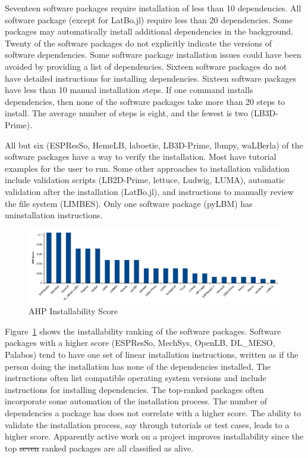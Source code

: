 \documentclass[final, 3p, times, authoryear]{elsarticle}
\providecommand{\DIFaddtex}[1]{{\protect\color{blue}\uwave{#1}}} %
\providecommand{\DIFdeltex}[1]{{\protect\color{red}\sout{#1}}}                      %
\providecommand{\DIFaddbegin}{} %
\providecommand{\DIFaddend}{} %
\providecommand{\DIFdelbegin}{} %
\providecommand{\DIFdelend}{} %
\providecommand{\DIFadd}[1]{\texorpdfstring{\DIFaddtex{#1}}{#1}} %
\providecommand{\DIFdel}[1]{\texorpdfstring{\DIFdeltex{#1}}{}} %
\begin{document}
Seventeen software packages require installation of less than 10 dependencies.
All software package (except for LatBo.jl) require less than 20 dependencies.
Some packages may automatically install additional dependencies in the
background. Twenty of the software packages do not explicitly indicate the
versions of software dependencies. Some software package installation issues
could have been avoided by providing a list of dependencies. Sixteen software
packages do not have detailed instructions for installing dependencies. Sixteen
software packages have less than 10 manual installation steps. If one command
installs dependencies, then none of the software packages take more than 20
steps to install. The average number of steps is eight, and the fewest is two
(LB3D-Prime).

All but six (ESPResSo, HemeLB, laboetie, LB3D-Prime, lbmpy, waLBerla) of the
software packages have a way to verify the installation. Most have tutorial
examples for the user to run. Some other approaches to installation validation
include validation scripts (LB2D-Prime, lettuce, Ludwig, LUMA), automatic
validation after the installation (LatBo.jl), and instructions to manually
review the file system (LIMBES). Only one software package (pyLBM) has
uninstallation instructions.

\begin{figure}[h!]
	\begin{center}
		\includegraphics[width=1.0\textwidth]{./figures/installability_chart.pdf}
		\caption{AHP Installability Score}
		\label{Fig_Installability}
	\end{center}
\end{figure}

Figure~\ref{Fig_Installability} shows the installability ranking of the software
packages. Software packages with a higher score (ESPResSo, MechSys, OpenLB,
DL\_MESO, Palabos\DIFaddbegin \DIFadd{, Sailfish}\DIFaddend ) tend to have one set of linear installation
instructions, written as if the person doing the installation has none of the
dependencies installed. The instructions often list compatible operating system
versions and include instructions for installing dependencies. The top-ranked
packages often incorporate some automation of the installation process. The
number of dependencies a package has does not correlate with a higher score. The
ability to validate the installation process, say through tutorials or test
cases, leads to a higher score. Apparently active work on a project improves
installability since the top \DIFdelbegin \DIFdel{seven }\DIFdelend \DIFaddbegin \DIFadd{six }\DIFaddend ranked packages are all classified as alive. 
\end{document}
